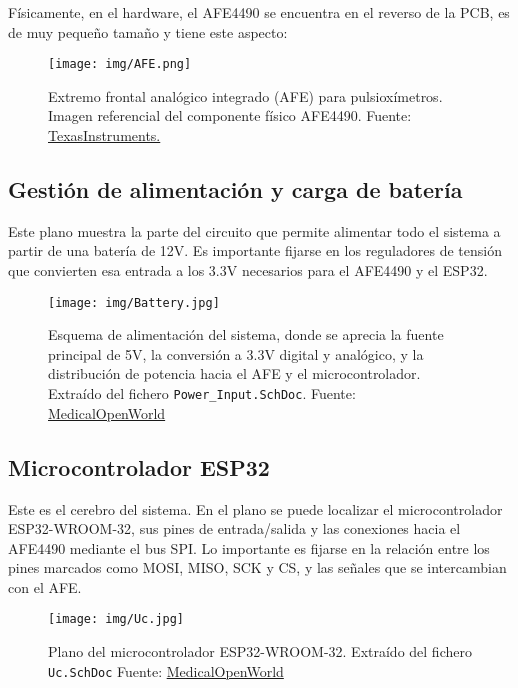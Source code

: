 Físicamente, en el hardware, el AFE4490 se encuentra en el reverso de la PCB, es de muy pequeño tamaño y tiene este aspecto:

\begin{figure}[H]
    \centering
    \texttt{[image: img/AFE.png]}
    \caption{Extremo frontal analógico integrado (AFE) para pulsioxímetros. Imagen referencial del componente físico AFE4490. Fuente: \href{https://www.ti.com/product/es-mx/AFE4490/part-details/AFE4490RHAT}{TexasInstruments.}}
    \label{fig:AFE2}
\end{figure}


\subsection{Gestión de alimentación y carga de batería}

Este plano muestra la parte del circuito que permite alimentar todo el sistema a partir de una batería de 12V. Es importante fijarse en los reguladores de tensión que convierten esa entrada a los 3.3V necesarios para el AFE4490 y el ESP32. 


\begin{figure}[H]
    \centering
    \texttt{[image: img/Battery.jpg]}
    \caption{Esquema de alimentación del sistema, donde se aprecia la fuente principal de 5V, la conversión a 3.3V digital y analógico, y la distribución de potencia hacia el AFE y el microcontrolador. Extraído del fichero \texttt{Power\_Input.SchDoc}. Fuente: \href{https://medicalopenworld.org/}{MedicalOpenWorld}}
    \label{fig:Battery}
\end{figure}

\subsection{Microcontrolador ESP32}

Este es el cerebro del sistema. En el plano se puede localizar el microcontrolador ESP32-WROOM-32, sus pines de entrada/salida y las conexiones hacia el AFE4490 mediante el bus SPI. Lo importante es fijarse en la relación entre los pines marcados como MOSI, MISO, SCK y CS, y las señales que se intercambian con el AFE.


\begin{figure}[H]
\centering
\texttt{[image: img/Uc.jpg]}
\caption{Plano del microcontrolador ESP32-WROOM-32. Extraído del fichero \texttt{Uc.SchDoc} Fuente: \href{https://medicalopenworld.org/}{MedicalOpenWorld} }
\end{figure}


